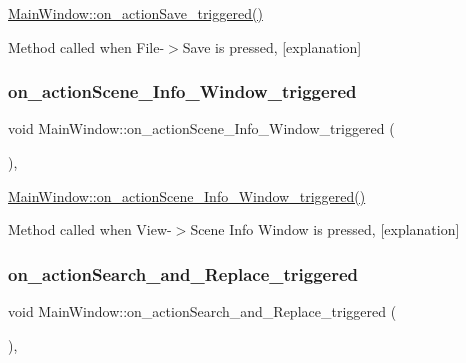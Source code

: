 \hyperlink{class_main_window_ad550c61cfa05c7e528dedc6cf636ed10}{Main\+Window\+::on\+\_\+action\+Save\+\_\+triggered()} 

Method called when File-\/$>$Save is pressed, \mbox{[}explanation\mbox{]} \mbox{\label{class_main_window_a5e8eef1130ab17d4f10ae161eb372bc8}} 
\subsubsection{\texorpdfstring{on\+\_\+action\+Scene\+\_\+\+Info\+\_\+\+Window\+\_\+triggered}{on\_actionScene\_Info\_Window\_triggered}}
{\footnotesize\ttfamily void Main\+Window\+::on\+\_\+action\+Scene\+\_\+\+Info\+\_\+\+Window\+\_\+triggered (\begin{DoxyParamCaption}{ }\end{DoxyParamCaption})\hspace{0.3cm}{\ttfamily [private]}, {\ttfamily [slot]}}



\hyperlink{class_main_window_a5e8eef1130ab17d4f10ae161eb372bc8}{Main\+Window\+::on\+\_\+action\+Scene\+\_\+\+Info\+\_\+\+Window\+\_\+triggered()} 

Method called when View-\/$>$Scene Info Window is pressed, \mbox{[}explanation\mbox{]} \mbox{\label{class_main_window_a8447eeb10a01419b396f470c0745ec01}} 
\subsubsection{\texorpdfstring{on\+\_\+action\+Search\+\_\+and\+\_\+\+Replace\+\_\+triggered}{on\_actionSearch\_and\_Replace\_triggered}}
{\footnotesize\ttfamily void Main\+Window\+::on\+\_\+action\+Search\+\_\+and\+\_\+\+Replace\+\_\+triggered (\begin{DoxyParamCaption}{ }\end{DoxyParamCaption})\hspace{0.3cm}{\ttfamily [private]}, {\ttfamily [slot]}}



